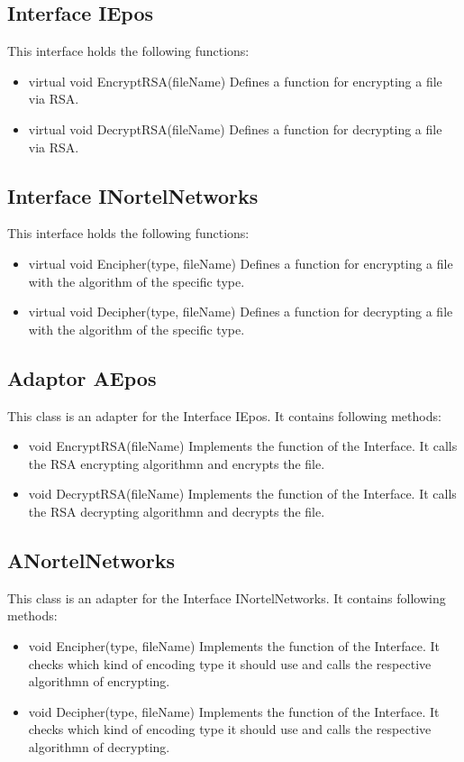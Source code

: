\subsection{Interface IEpos}
This interface holds the following functions:
\begin{itemize}
\item virtual  void EncryptRSA(fileName)
\subitem Defines a function for encrypting a file via RSA.
\item virtual void DecryptRSA(fileName)
\subitem Defines a function for decrypting a file via RSA.
\end{itemize}

\subsection{Interface INortelNetworks}
This interface holds the following functions:
\begin{itemize}
\item virtual  void Encipher(type, fileName)
\subitem Defines a function for encrypting a file with the algorithm of the specific type.
\item virtual void Decipher(type, fileName)
\subitem Defines a function for decrypting a file with the algorithm of the specific type.
\end{itemize}

\subsection{Adaptor AEpos}
This class is an adapter for the Interface IEpos. It contains following methods:
\begin{itemize}
\item void EncryptRSA(fileName)
\subitem Implements the function of the Interface. It calls the RSA encrypting algorithmn and encrypts the file.
\item void DecryptRSA(fileName)
\subitem Implements the function of the Interface. It calls the RSA decrypting algorithmn and decrypts the file.
\end{itemize}

\subsection{ANortelNetworks}
This class is an adapter for the Interface INortelNetworks. It contains following methods:
\begin{itemize}
\item void Encipher(type, fileName)
\subitem Implements the function of the Interface. It checks which kind of encoding type it should use and calls
the respective algorithmn of encrypting.
\item void Decipher(type, fileName)
\subitem Implements the function of the Interface. It checks which kind of encoding type it should use and calls
the respective algorithmn of decrypting.
\end{itemize}

